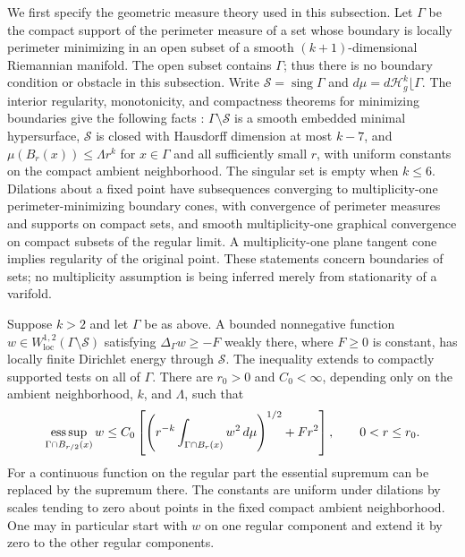 We first specify the geometric measure theory used in this subsection.
Let $\Gamma$ be the compact support of the perimeter measure of a set
whose boundary is locally perimeter minimizing in an open subset of a
smooth $(k+1)$-dimensional Riemannian manifold.  The open subset contains
$\Gamma$; thus there is no boundary condition or obstacle in this
subsection.  Write $\mathcal S=\operatorname{sing}\Gamma$ and
$d\mu=d\mathcal H^k_g\lfloor\Gamma$.
The interior regularity, monotonicity, and compactness theorems for
minimizing boundaries give the following facts \cite{Simon2018}:
$\Gamma\setminus\mathcal S$ is a smooth embedded minimal hypersurface,
$\mathcal S$ is closed with Hausdorff dimension at most $k-7$, and
$\mu(B_r(x))\leq\Lambda r^k$ for $x\in\Gamma$ and all sufficiently small
$r$, with uniform constants on the compact ambient neighborhood.
The singular set is empty when $k\leq6$.
Dilations about a fixed point have subsequences converging to
multiplicity-one perimeter-minimizing boundary cones, with convergence
of perimeter measures and supports on compact sets, and smooth
multiplicity-one graphical convergence on compact subsets of the
regular limit.  A multiplicity-one plane tangent cone implies
regularity of the original point.  These statements concern boundaries
of sets; no multiplicity assumption is being inferred merely from
stationarity of a varifold.

\begin{lemma}
\label{lem:variation:capacity-submean}
Suppose $k>2$ and let $\Gamma$ be as above.  A bounded nonnegative
function $w\in W^{1,2}_{\mathrm{loc}}(\Gamma\setminus\mathcal S)$
satisfying $\Delta_\Gamma w\geq-F$ weakly there, where $F\geq0$ is
constant, has locally finite Dirichlet energy through $\mathcal S$.
The inequality extends to compactly supported tests on all of
$\Gamma$.  There are $r_0>0$ and $C_0<\infty$, depending only on the
ambient neighborhood, $k$, and $\Lambda$, such that
\[
 \mathop{\rm ess\,sup}_{\Gamma\cap B_{r/2}(x)} w
 \leq C_0\left[
       \left(r^{-k}\int_{\Gamma\cap B_r(x)}w^2\,d\mu\right)^{1/2}
       +Fr^2\right],\qquad 0<r\leq r_0.
\]
For a continuous function on the regular part the essential supremum
can be replaced by the supremum there.  The constants are uniform
under dilations by scales tending to zero about points in the fixed
compact ambient neighborhood.  One may in particular start with $w$
on one regular component and extend it by zero to the other regular
components.
\end{lemma}

